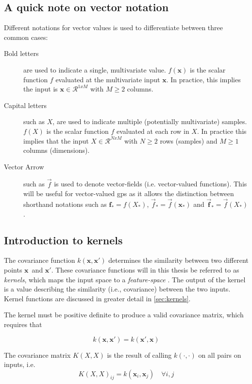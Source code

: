 \subsection{A quick note on vector notation}
Different notations for vector values is used to differentiate between three common cases:
\begin{description}
\item[Bold letters] are used to indicate a single, multivariate value. $f(\boldsymbol{x})$ is the scalar function $f$ evaluated at the multivariate input $\boldsymbol{x}$. In practice, this implies the input is $\boldsymbol{x} \in \mathcal{R}^{1 x M}$ with $M\geq 2$ columns. 
\item[Capital letters] such as $X$, are used to indicate multiple (potentially multivariate) samples. $f(X)$ is the scalar function $f$ evaluated at each row in $X$. In practice this implies that the input $X \in \mathcal{R}^{N x M}$ with $N \geq 2$ rows (samples) and $M \geq 1$ columns (dimensions).
\item[Vector Arrow] such as $\vec{f}$ is used to denote vector-fields (i.e. vector-valued functions). This will be useful for vector-valued \acrshort{gp}s as it allows the distinction between shorthand notations such as $\boldsymbol{f}_* = f(X_*)$, $\vec{f}_* = \vec{f}(\boldsymbol{x}_*)$ and $\vec{\boldsymbol{f}}_* = \vec{f}(X_*)$.
\end{description}

\subsection{Introduction to kernels}
The covariance function $k(\boldsymbol{x}, \boldsymbol{x}')$ determines the similarity between two different points $\boldsymbol{x}$ and $\boldsymbol{x}'$. These covariance functions will in this thesis be referred to as \textit{kernels}, which maps the input space to a \textit{feature-space} \cite{rasmussen}. The output of the kernel is a value describing the similarity (i.e., covariance) between the two inputs. Kernel functions are discussed in greater detail in \cref{sec:kernels}.

The kernel must be positive definite to produce a valid covariance matrix, which requires that

\begin{equation}
    k(\boldsymbol{x}, \boldsymbol{x}') = k(\boldsymbol{x}', \boldsymbol{x})
\end{equation}

The covariance matrix $K(X, X)$ is the result of calling $k(\cdot, \cdot)$ on all pairs on inputs, i.e.
\begin{equation} 
    K(X, X)_{ij} = k(\boldsymbol{x}_i, \boldsymbol{x}_j) \quad \forall i, j
\end{equation}

